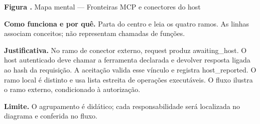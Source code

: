 {\small\textbf{Figura \thefigure.} Mapa mental --- Fronteiras MCP e conectores do host}\par\smallskip
\noindent\textbf{Como funciona e por quê.} Parta do centro e leia os quatro ramos. As linhas associam conceitos; não representam chamadas de funções.\par
\noindent\textbf{Justificativa.} No ramo de conector externo, request produz awaiting\_host. O host autenticado deve chamar a ferramenta declarada e devolver resposta ligada ao hash da requisição. A aceitação valida esse vínculo e registra host\_reported. O ramo local é distinto e usa lista estreita de operações executáveis. O fluxo ilustra o ramo externo, condicionado à autorização.\par
\noindent\textbf{Limite.} O agrupamento é didático; cada responsabilidade será localizada no diagrama e conferida no fluxo.\par\smallskip
{}
